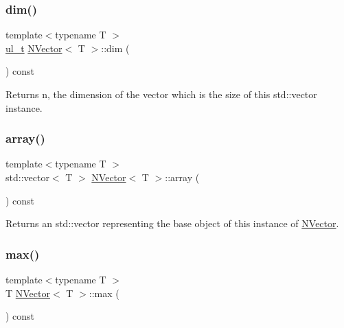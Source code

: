 \mbox{\label{class_n_vector_a7589027db20509ac4d93490bb9a1979a}} 
\subsubsection{\texorpdfstring{dim()}{dim()}}
{\footnotesize\ttfamily template$<$typename T $>$ \\
\mbox{\hyperlink{typedef_8h_a1b140a2034db3f5dfe18a987745df43a}{ul\+\_\+t}} \mbox{\hyperlink{class_n_vector}{N\+Vector}}$<$ T $>$\+::dim (\begin{DoxyParamCaption}{ }\end{DoxyParamCaption}) const}

\begin{DoxyReturn}{Returns}
n, the dimension of the vector which is the size of this std\+::vector instance. 
\end{DoxyReturn}
\mbox{\label{class_n_vector_aa99d9fea7e30357df42f736013506fe1}} 
\subsubsection{\texorpdfstring{array()}{array()}}
{\footnotesize\ttfamily template$<$typename T $>$ \\
std\+::vector$<$ T $>$ \mbox{\hyperlink{class_n_vector}{N\+Vector}}$<$ T $>$\+::array (\begin{DoxyParamCaption}{ }\end{DoxyParamCaption}) const}

\begin{DoxyReturn}{Returns}
an std\+::vector representing the base object of this instance of \mbox{\hyperlink{class_n_vector}{N\+Vector}}. 
\end{DoxyReturn}
\mbox{\label{class_n_vector_afc7553743872ccb71e902a154eb60dc2}} 
\subsubsection{\texorpdfstring{max()}{max()}}
{\footnotesize\ttfamily template$<$typename T $>$ \\
T \mbox{\hyperlink{class_n_vector}{N\+Vector}}$<$ T $>$\+::max (\begin{DoxyParamCaption}{ }\end{DoxyParamCaption}) const}


